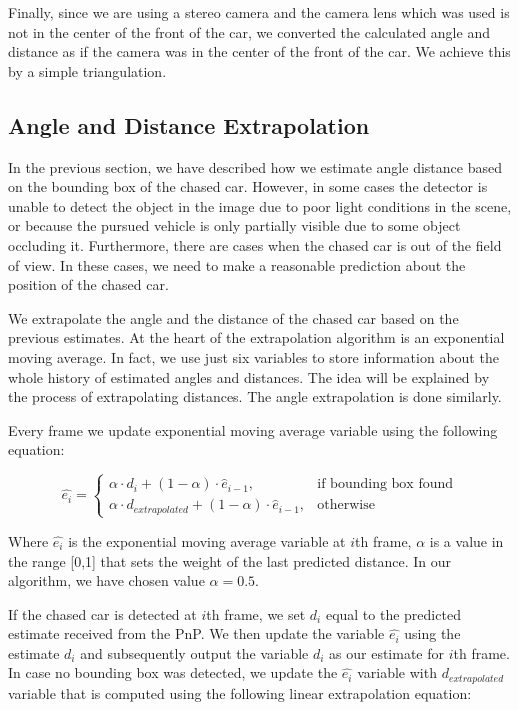 \documentclass{ctuthesis/ctuthesis}
\begin{document}
Finally, since we are using a stereo camera and the camera lens which was used is not in the center of the front of the car, we converted the calculated angle and distance as if the camera was in the center of the front of the car. We achieve this by a simple triangulation.

\subsection{Angle and Distance Extrapolation}
In the previous section, we have described how we estimate angle distance based on the bounding box of the chased car. However, in some cases the detector is unable to detect the object in the image due to poor light conditions in the scene, or because the pursued vehicle is only partially visible due to some object occluding it. Furthermore, there are cases when the chased car is out of the field of view. In these cases, we need to make a reasonable prediction about the position of the chased car. \par


We extrapolate the angle and the distance of the chased car based on the previous estimates. At the heart of the extrapolation algorithm is an exponential moving average. In fact, we use just six variables to store information about the whole history of estimated angles and distances. The idea will be explained by the process of extrapolating distances. The angle extrapolation is done similarly. \par


Every frame we update exponential moving average variable using the following equation:\par


\begin{equation}
    \hat{e_{i}}=
    \begin{cases}
      \alpha\cdot d_i + (1-\alpha)\cdot \hat{e}_{i-1}, & \text{if bounding box found} \\
      \alpha\cdot d_{extrapolated} + (1-\alpha)\cdot \hat{e}_{i-1}, & \text{otherwise}
    \end{cases}
\end{equation}

Where $\hat{e_{i}}$ is the exponential moving average variable at $i$th frame, $\alpha$ is a value in the range [0,1] that sets the weight of the last predicted distance. In our algorithm, we have chosen value $\alpha=0.5$. \par

If the chased car is detected at $i$th frame, we set $d_i$ equal to the predicted estimate received from the PnP. We then update the variable $\hat{e_{i}}$ using the estimate $d_i$ and subsequently output the variable $d_i$ as our estimate for $i$th frame. In case no bounding box was detected, we update the $\hat{e_{i}}$ variable with $d_{extrapolated}$ variable that is computed using the following linear extrapolation equation:
\end{document}
